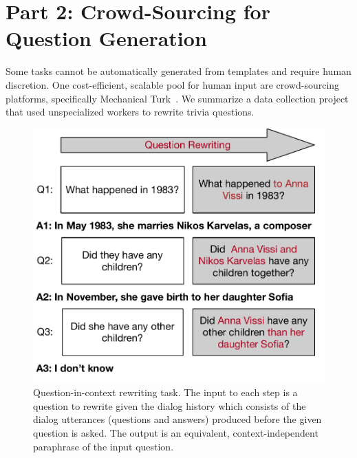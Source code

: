 \section{Part 2: Crowd-Sourcing for Question Generation}
\label{sec:crowdqa}

Some tasks cannot be automatically generated from templates and require human discretion.  
%
One cost-efficient, scalable pool for human input are crowd-sourcing platforms, specifically Mechanical Turk~\citep{buhrmester2016amazon}.
%
We summarize a data collection project that used unspecialized workers to rewrite trivia questions.  

%


\begin{figure}[t!]
	\centering
	\includegraphics[width=.8\linewidth]{denis_proposal/figures/F1_OmniVersion.pdf}
	\caption{Question-in-context rewriting task. The input to each step
	is a question to rewrite given the dialog history which consists
	of the dialog utterances (questions and answers)  
	produced before the given question is asked. The output is an equivalent, context-independent paraphrase of the input question.}
	\label{fig:example_convo}
\end{figure}

